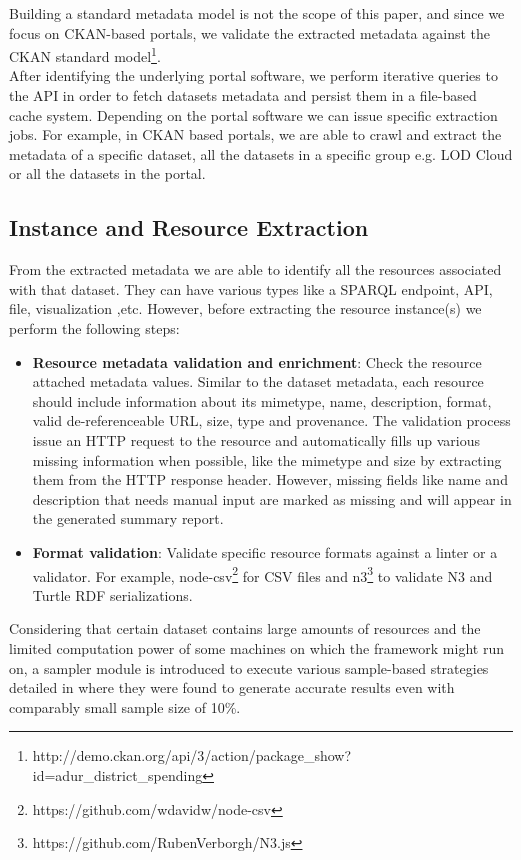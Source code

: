 \documentclass[runningheads,a4paper]{llncs}
\begin{document}
Building a standard metadata model is not the scope of this paper, and since we focus on CKAN-based portals, we validate the extracted metadata against the CKAN standard model\footnote{http://demo.ckan.org/api/3/action/package\_show?id=adur\_district\_spending}.\\
After identifying the underlying portal software, we perform iterative queries to the API in order to fetch datasets metadata and persist them in a file-based cache system.
Depending on the portal software we can issue specific extraction jobs. For example, in CKAN based portals, we are able to crawl and extract the metadata of a specific dataset, all the datasets in a specific group e.g. LOD Cloud or all the datasets in the portal.

\subsection{Instance and Resource Extraction}

From the extracted metadata we are able to identify all the resources associated with that dataset. They can have various types like a SPARQL endpoint, API, file, visualization ,etc. However, before extracting the resource instance(s) we perform the following steps:

\begin{itemize}
  \item \textbf{Resource metadata validation and enrichment}: Check the resource attached metadata values. Similar to the dataset metadata, each resource should include information about its mimetype, name, description, format, valid de-referenceable URL, size, type and provenance. The validation process issue an HTTP request to the resource and automatically fills up various missing information when possible, like the mimetype and size by extracting them from the HTTP response header. However, missing fields like name and description that needs manual input are marked as missing and will appear in the generated summary report.
  \item \textbf{Format validation}: Validate specific resource formats against a linter or a validator. For example, node-csv\footnote{https://github.com/wdavidw/node-csv} for CSV files and n3\footnote{https://github.com/RubenVerborgh/N3.js} to validate N3 and Turtle RDF serializations.
\end{itemize}

Considering that certain dataset contains large amounts of resources and the limited computation power of some machines on which the framework might run on, a sampler module is introduced to execute various sample-based strategies detailed in \cite{scalableApproach} where they were found to generate accurate results even with comparably small sample size of 10\%.
\end{document}
